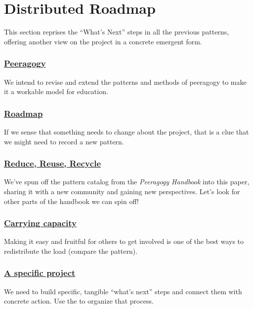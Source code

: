 \section{Distributed Roadmap} \label{sec:Distributed_Roadmap}

This section reprises the ``What's Next'' steps in all the previous
patterns, offering another view on the project 
in a concrete emergent form.

\subsubsection*{\hyperref[sec:Peeragogy_Project]{Peeragogy}} 
 We intend to revise and extend the patterns and methods of peeragogy to make it a workable model for education.

\subsubsection*{\hyperref[sec:Roadmap]{Roadmap}} If we sense that something needs to change about the project, that is a clue that we might need to record a new pattern.

\subsubsection*{\hyperref[sec:Use_or_make]{Reduce, Reuse, Recycle}}
We've spun off the pattern catalog from the \emph{Peeragogy Handbook} into this paper, sharing it with a new community and gaining new perspectives.  Let's look for other parts of the handbook we can spin off!

\subsubsection*{\hyperref[sec:Carrying_capacity]{Carrying capacity}} 
Making it easy and fruitful for others to get involved is one of the best ways to
redistribute the load (compare the
pattern).

\subsubsection*{\hyperref[sec:A_specific_project]{A specific project}}
We need to build specific, tangible ``what's next'' steps and connect them with concrete action. Use the  to organize that process. 

